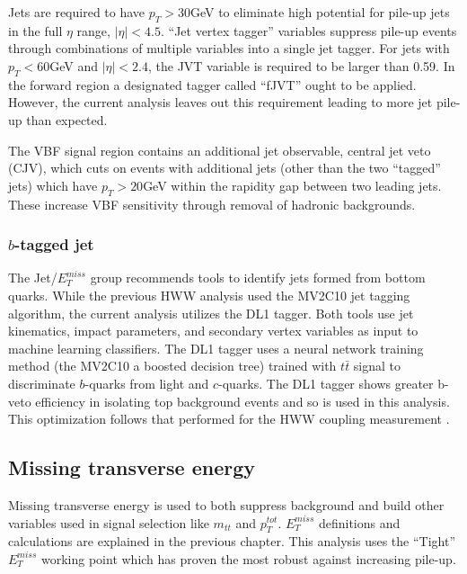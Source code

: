 Jets are required to have $p_T > 30$GeV to eliminate high potential for pile-up jets in the full $\eta$ range, $|\eta| < 4.5$. ``Jet vertex tagger'' variables suppress pile-up events through combinations of multiple variables into a single jet tagger. For jets with $p_T < 60$GeV and $|\eta| < 2.4$, the JVT variable is required to be larger than 0.59. In the forward region a designated tagger called ``fJVT'' ought to be applied. However, the current analysis leaves out this requirement leading to more jet pile-up than expected. 

The VBF signal region contains an additional jet observable, central jet veto (CJV), which cuts on events with additional jets (other than the two ``tagged'' jets) which have $p_T>20$GeV within the rapidity gap between two leading jets. These increase VBF sensitivity through removal of hadronic backgrounds.
\subsubsection{$b$-tagged jet}

The Jet/$E_T^{miss}$ group recommends tools to identify jets formed from bottom quarks. While the previous HWW analysis used the MV2C10 jet tagging algorithm, the current analysis utilizes the DL1 tagger. Both tools use jet kinematics, impact parameters, and secondary vertex variables as input to machine learning classifiers. The DL1 tagger uses a neural network training method (the MV2C10 a boosted decision tree) trained with $t\bar{t}$ signal to discriminate $b$-quarks from light and $c$-quarks. The DL1 tagger shows greater b-veto efficiency in isolating top background events and so is used in this analysis. This optimization follows that performed for the HWW coupling measurement \cite{HWWCoupling}. 

\subsection{Missing transverse energy}

Missing transverse energy is used to both suppress background and build other variables used in signal selection like $m_{tt}$ and $p_T^{tot}$. $E_T^{miss}$ definitions and calculations are explained in the previous chapter. This analysis uses the ``Tight'' $E_T^{miss}$ working point which has proven the most robust against increasing pile-up.

